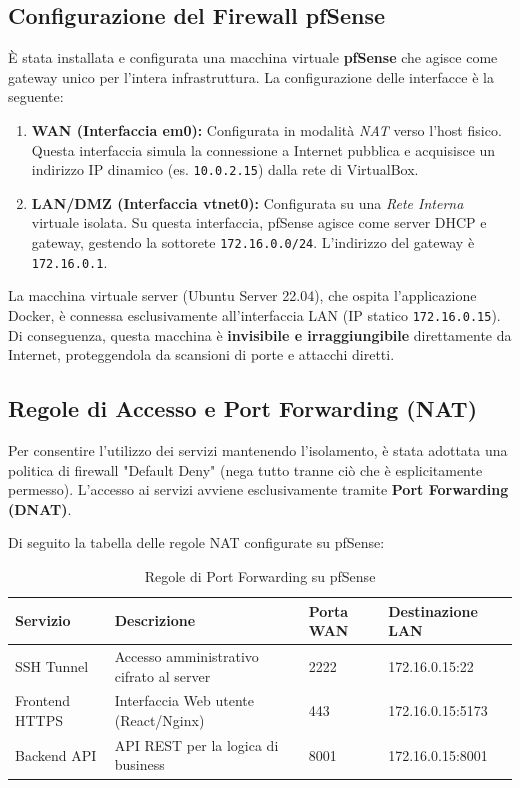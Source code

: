 \documentclass[a4paper, 12pt, titlepage]{article}
\begin{document}
\subsection{Configurazione del Firewall pfSense}
È stata installata e configurata una macchina virtuale \textbf{pfSense} che agisce come gateway unico per l'intera infrastruttura. La configurazione delle interfacce è la seguente:

\begin{enumerate}
    \item \textbf{WAN (Interfaccia em0):} Configurata in modalità \textit{NAT} verso l'host fisico. Questa interfaccia simula la connessione a Internet pubblica e acquisisce un indirizzo IP dinamico (es. \texttt{10.0.2.15}) dalla rete di VirtualBox.
    \item \textbf{LAN/DMZ (Interfaccia vtnet0):} Configurata su una \textit{Rete Interna} virtuale isolata. Su questa interfaccia, pfSense agisce come server DHCP e gateway, gestendo la sottorete \texttt{172.16.0.0/24}. L'indirizzo del gateway è \texttt{172.16.0.1}.
\end{enumerate}

La macchina virtuale server (Ubuntu Server 22.04), che ospita l'applicazione Docker, è connessa esclusivamente all'interfaccia LAN (IP statico \texttt{172.16.0.15}). Di conseguenza, questa macchina è \textbf{invisibile e irraggiungibile} direttamente da Internet, proteggendola da scansioni di porte e attacchi diretti.

\subsection{Regole di Accesso e Port Forwarding (NAT)}
Per consentire l'utilizzo dei servizi mantenendo l'isolamento, è stata adottata una politica di firewall "Default Deny" (nega tutto tranne ciò che è esplicitamente permesso). L'accesso ai servizi avviene esclusivamente tramite \textbf{Port Forwarding (DNAT)}.

Di seguito la tabella delle regole NAT configurate su pfSense:

\begin{table}[H]
\centering
\caption{Regole di Port Forwarding su pfSense}
\vspace{0.2cm}
\begin{tabularx}{\textwidth}{|l|X|l|l|}
\hline
\textbf{Servizio} & \textbf{Descrizione} & \textbf{Porta WAN} & \textbf{Destinazione LAN} \\ \hline
SSH Tunnel & Accesso amministrativo cifrato al server & 2222 & 172.16.0.15:22 \\ \hline
Frontend HTTPS & Interfaccia Web utente (React/Nginx) & 443 & 172.16.0.15:5173 \\ \hline
Backend API & API REST per la logica di business & 8001 & 172.16.0.15:8001 \\ \hline
\end{tabularx}
\end{table}
\end{document}
